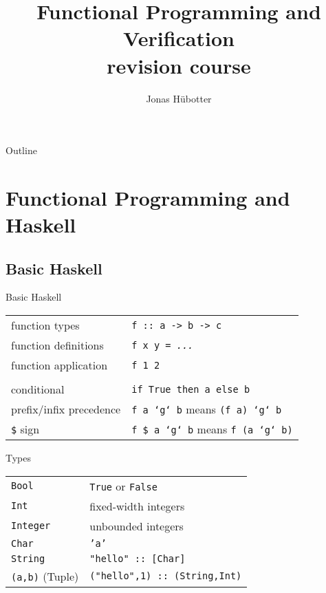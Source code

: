 \documentclass{beamer}
\title[FPV revision course]{Functional Programming and Verification \\ revision course}
\author{Jonas Hübotter}
\def\code#1{\texttt{\frenchspacing#1}}
\begin{document}
\begin{frame}
  \titlepage
\end{frame}

\begin{frame}{Outline}
 \tableofcontents[subsectionstyle=hide, subsubsectionstyle=hide]
\end{frame}

\section{Functional Programming and Haskell}

\subsection{Basic Haskell}

\begin{frame}{Basic Haskell}

\begin{tabular}{ll}
    function types & \code{f :: a -> b -> c}\pause \\
    function definitions & \code{f x y = \textit{...}}\pause \\
    function application & \code{f 1 2}\pause \\
    & \\
    conditional & \code{if True then a else b}\pause \\
    prefix/infix precedence & \code{f a `g` b} means \code{(f a) `g` b}\pause \\
    \code{\$} sign & \code{f \$ a `g` b} means \code{f (a `g` b)} \\
\end{tabular}

\end{frame}

\begin{frame}{Types}

\begin{tabular}{ll}
    \code{Bool} & \code{True} or \code{False}\pause \\
    \code{Int} & fixed-width integers\pause \\
    \code{Integer} & unbounded integers\pause \\
    \code{Char} & \code{'a'}\pause \\
    \code{String} & \code{"hello" :: [Char]}\pause \\
    \code{(a,b)} (Tuple) & \code{("hello",1) :: (String,Int)}
\end{tabular}

\end{frame}
\end{document}
